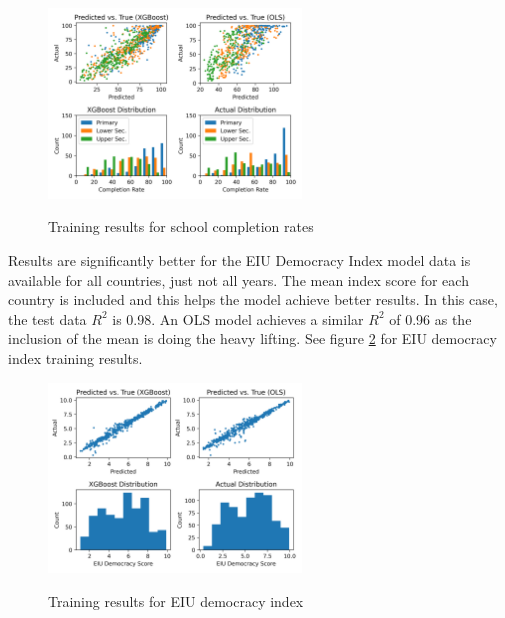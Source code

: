 \documentclass[11pt]{article}
\begin{document}
\begin{figure}[H]
    \caption{Training results for school completion rates}
    \centering
    \includegraphics[width=0.6\textwidth]{../build/xgboost.png}
    \label{fig:xgboost-school}
\end{figure}

Results are significantly better for the EIU Democracy Index model data is available for all countries, just not all years. The mean index score for each country is included and this helps the model achieve better results. In this case, the test data $R^2$ is 0.98. An OLS model achieves a similar $R^2$ of 0.96 as the inclusion of the mean is doing the heavy lifting. See figure \ref{fig:xgboost-eiu} for EIU democracy index training results.

\begin{figure}[H]
    \caption{Training results for EIU democracy index}
    \centering
    \includegraphics[width=0.6\textwidth]{../build/eiu_xgboost.png}
    \label{fig:xgboost-eiu}
\end{figure}
\end{document}
